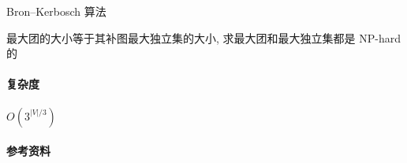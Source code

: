 Bron--Kerbosch 算法

最大团的大小等于其补图最大独立集的大小, 求最大团和最大独立集都是 NP-hard 的

\paragraph{复杂度} \(O\left(3^{|V|/3}\right)\)

\paragraph{参考资料} \cite{enwiki:1209826174}
